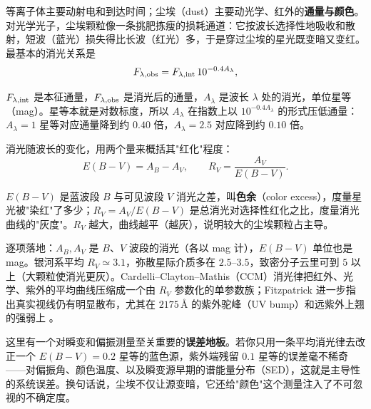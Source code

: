 等离子体主要动射电和到达时间；尘埃（dust）主要动光学、红外的\textbf{通量与颜色}。对光学光子，尘埃颗粒像一条挑肥拣瘦的损耗通道：它按波长选择性地吸收和散射，短波（蓝光）损失得比长波（红光）多，于是穿过尘埃的星光既变暗又变红。最基本的消光关系是
\begin{equation}
  F_{\lambda,{\rm obs}}
  =
  F_{\lambda,{\rm int}}\,10^{-0.4A_\lambda},
  \label{eq:e21-extinction-flux}
\end{equation}
\begin{formulaexplain}
\(F_{\lambda,{\rm int}}\) 是本征通量，\(F_{\lambda,{\rm obs}}\) 是消光后的通量，\(A_\lambda\) 是波长 \(\lambda\) 处的消光，单位星等（mag）。星等本就是对数标度，所以 \(A_\lambda\) 在指数上以 \(10^{-0.4A_\lambda}\) 的形式压低通量：\(A_\lambda=1\) 星等对应通量降到约 \(0.40\) 倍，\(A_\lambda=2.5\) 对应降到约 \(0.10\) 倍。
\end{formulaexplain}
消光随波长的变化，用两个量来概括其"红化"程度：
\begin{equation}
  E(B-V)=A_B-A_V,
  \qquad
  R_V=\frac{A_V}{E(B-V)}.
  \label{eq:e21-rv-definition}
\end{equation}
\begin{formulaexplain}
\(E(B-V)\) 是蓝波段 \(B\) 与可见波段 \(V\) 消光之差，叫\textbf{色余}（color excess），度量星光被"染红"了多少；\(R_V=A_V/E(B-V)\) 是总消光对选择性红化之比，度量消光曲线的"灰度"。\(R_V\) 越大，曲线越平（越灰），说明较大的尘埃颗粒占主导。
\end{formulaexplain}
逐项落地：\(A_B,A_V\) 是 \(B\)、\(V\) 波段的消光（各以 mag 计），\(E(B-V)\) 单位也是 mag。银河系平均 \(R_V\simeq3.1\)，弥散星际介质多在 \(2.5\text{--}3.5\)，致密分子云里可到 \(5\) 以上（大颗粒使消光更灰）。Cardelli–Clayton–Mathis（CCM）消光律把红外、光学、紫外的平均曲线压缩成一个由 \(R_V\) 参数化的单参数族；Fitzpatrick 进一步指出真实视线仍有明显散布，尤其在 \(2175\,\text{\AA}\) 的紫外驼峰（UV bump）和远紫外上翘的强弱上 \citep{1989ApJ...345..245C,1999PASP..111...63F,2003ARA&A..41..241D}。

这里有一个对瞬变和偏振测量至关重要的\textbf{误差地板}。若你只用一条平均消光律去改正一个 \(E(B-V)=0.2\) 星等的蓝色源，紫外端残留 \(0.1\) 星等的误差毫不稀奇——对偏振角、颜色温度、以及瞬变源早期的谱能量分布（SED），这就是主导性的系统误差。换句话说，尘埃不仅让源变暗，它还给"颜色"这个测量注入了不可忽视的不确定度。

